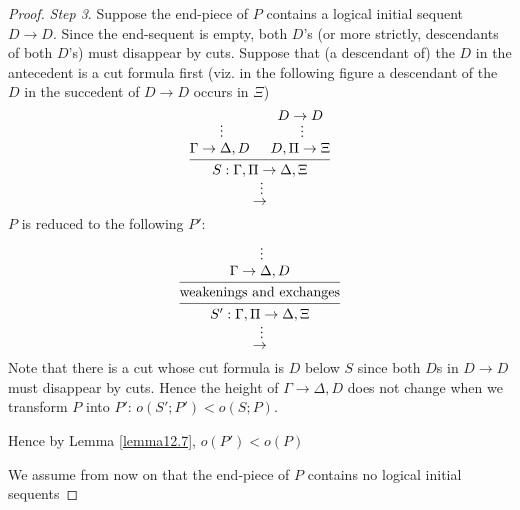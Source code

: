 \documentclass[11pt]{article}
\begin{document}
\begin{enumerate}
\begin{proof}
\emph{Step 3}. Suppose the end-piece of \(P\) contains a logical initial sequent \(D\to D\). Since
the end-sequent is empty, both \(D\)'s (or more strictly, descendants of both \(D\)'s) must
disappear by cuts. Suppose that (a descendant of) the \(D\) in the antecedent is a cut formula
first (viz. in the following figure a descendant of the \(D\) in the succedent of \(D\to D\)
occurs in \(\Xi\))
  \begin{equation*}
\begin{prooftree}%
\hypo{}
\ellipsis{}{\Gamma \to \Delta,D}
\hypo{D\to D}
\ellipsis{}{D,\Pi \to \Xi}
\infer2{S:\Gamma,\Pi \to \Delta,\Xi}
\ellipsis{}{\to}
\end{prooftree}
  \end{equation*}
\(P\) is reduced to the following \(P'\):
  \begin{equation*}
\begin{prooftree}%
\hypo{}
\ellipsis{}{\Gamma \to \Delta,D}
\infer1{\text{weakenings and exchanges}}
\infer1{S':\Gamma,\Pi \to \Delta,\Xi}
\ellipsis{}{\to}
\end{prooftree}
  \end{equation*}
Note that there is a cut whose cut formula is \(D\) below \(S\) since both \(D\)s
in \(D\to D\) must disappear by cuts. Hence the height of \(\Gamma \to \Delta,D\) does not change when we
transform \(P\) into \(P'\): \(o(S';P')<o(S;P)\).

Hence by Lemma \ref{lemma12.7}, \(o(P')<o(P)\)

We assume from now on that the end-piece of \(P\) contains no logical initial sequents


\end{proof}
\end{enumerate}
\end{document}
